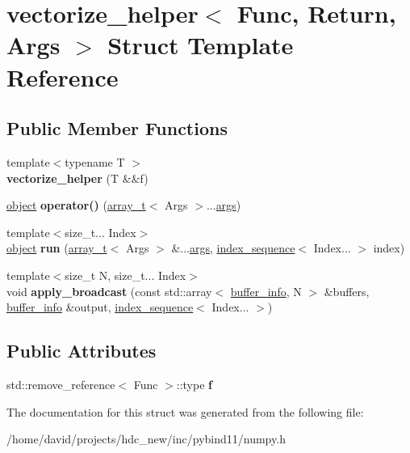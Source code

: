 \hypertarget{structvectorize__helper}{}\section{vectorize\+\_\+helper$<$ Func, Return, Args $>$ Struct Template Reference}
\label{structvectorize__helper}
\subsection*{Public Member Functions}
\begin{DoxyCompactItemize}
\item 
{\footnotesize template$<$typename T $>$ }\\{\bfseries vectorize\+\_\+helper} (T \&\&f)\hypertarget{structvectorize__helper_af05224004f4912718f47e98245b9efa7}{}\label{structvectorize__helper_af05224004f4912718f47e98245b9efa7}

\item 
\hyperlink{classobject}{object} {\bfseries operator()} (\hyperlink{classarray__t}{array\+\_\+t}$<$ Args $>$...\hyperlink{classargs}{args})\hypertarget{structvectorize__helper_a37e48d6fb7150f4d545eee86841ec603}{}\label{structvectorize__helper_a37e48d6fb7150f4d545eee86841ec603}

\item 
{\footnotesize template$<$size\+\_\+t... Index$>$ }\\\hyperlink{classobject}{object} {\bfseries run} (\hyperlink{classarray__t}{array\+\_\+t}$<$ Args $>$ \&...\hyperlink{classargs}{args}, \hyperlink{structindex__sequence}{index\+\_\+sequence}$<$ Index... $>$ index)\hypertarget{structvectorize__helper_a85008e24a14436093a64549cca325e8f}{}\label{structvectorize__helper_a85008e24a14436093a64549cca325e8f}

\item 
{\footnotesize template$<$size\+\_\+t N, size\+\_\+t... Index$>$ }\\void {\bfseries apply\+\_\+broadcast} (const std\+::array$<$ \hyperlink{structbuffer__info}{buffer\+\_\+info}, N $>$ \&buffers, \hyperlink{structbuffer__info}{buffer\+\_\+info} \&output, \hyperlink{structindex__sequence}{index\+\_\+sequence}$<$ Index... $>$)\hypertarget{structvectorize__helper_a143f3cdd7819ff4bbbbd278627420567}{}\label{structvectorize__helper_a143f3cdd7819ff4bbbbd278627420567}

\end{DoxyCompactItemize}
\subsection*{Public Attributes}
\begin{DoxyCompactItemize}
\item 
std\+::remove\+\_\+reference$<$ Func $>$\+::type {\bfseries f}\hypertarget{structvectorize__helper_ad10924cff05f09b05787445ee7129455}{}\label{structvectorize__helper_ad10924cff05f09b05787445ee7129455}

\end{DoxyCompactItemize}


The documentation for this struct was generated from the following file\+:\begin{DoxyCompactItemize}
\item 
/home/david/projects/hdc\+\_\+new/inc/pybind11/numpy.\+h\end{DoxyCompactItemize}
